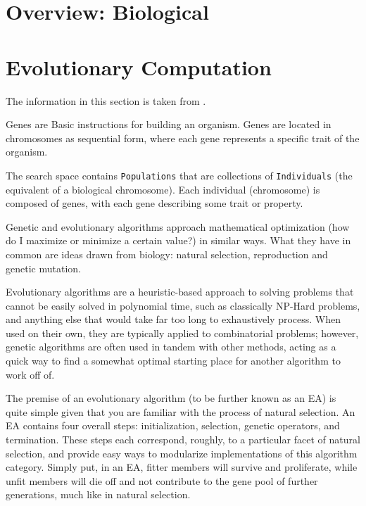 \section{Overview: Biological }




\section{Evolutionary Computation}

The information in this section is taken from \cite{DevinSoni2018,skymind2019,Song2016}.

Genes are Basic instructions for building an organism. Genes are located in chromosomes as sequential form, where each gene represents a specific trait of the organism.

The search space contains \lstinline{Populations} that are collections of \lstinline{Individuals} (the equivalent of a biological chromosome).  Each individual (chromosome) is composed of genes, with each gene describing some trait or property.


Genetic and evolutionary algorithms approach mathematical optimization (how do I maximize or minimize a certain value?) in similar ways. What they have in common are ideas drawn from biology: natural selection, reproduction and genetic mutation.

Evolutionary algorithms are a heuristic-based approach to solving problems that cannot be easily solved in polynomial time, such as classically NP-Hard problems, and anything else that would take far too long to exhaustively process. When used on their own, they are typically applied to combinatorial problems; however, genetic algorithms are often used in tandem with other methods, acting as a quick way to find a somewhat optimal starting place for another algorithm to work off of.

The premise of an evolutionary algorithm (to be further known as an EA) is quite simple given that you are familiar with the process of natural selection. An EA contains four overall steps: initialization, selection, genetic operators, and termination. These steps each correspond, roughly, to a particular facet of natural selection, and provide easy ways to modularize implementations of this algorithm category. Simply put, in an EA, fitter members will survive and proliferate, while unfit members will die off and not contribute to the gene pool of further generations, much like in natural selection.

